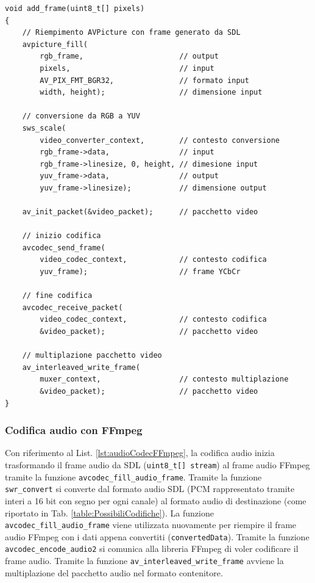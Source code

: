 \begin{lstlisting}[caption=Codice per la codifica video, label={lst:videoCodecFFmpeg}]
void add_frame(uint8_t[] pixels)
{
	// Riempimento AVPicture con frame generato da SDL
	avpicture_fill(
		rgb_frame, 						// output
		pixels, 						// input
		AV_PIX_FMT_BGR32,				// formato input
		width, height); 				// dimensione input

	// conversione da RGB a YUV
	sws_scale(
		video_converter_context,		// contesto conversione
		rgb_frame->data,				// input
		rgb_frame->linesize, 0, height,	// dimesione input
		yuv_frame->data, 				// output
		yuv_frame->linesize); 			// dimensione output
	
	av_init_packet(&video_packet);		// pacchetto video

	// inizio codifica
	avcodec_send_frame(
		video_codec_context,			// contesto codifica
		yuv_frame);						// frame YCbCr

	// fine codifica
	avcodec_receive_packet(
		video_codec_context,			// contesto codifica
		&video_packet);					// pacchetto video

	// multiplazione pacchetto video
	av_interleaved_write_frame(
		muxer_context,					// contesto multiplazione
		&video_packet);					// pacchetto video
}
\end{lstlisting}



\subsubsection{Codifica audio con FFmpeg}
Con riferimento al List. \ref{lst:audioCodecFFmpeg}, la codifica audio inizia trasformando il frame audio da SDL (\verb|uint8_t[] stream|) al frame audio FFmpeg tramite la funzione \verb|avcodec_fill_audio_frame|. Tramite la funzione \verb|swr_convert| si converte dal formato audio SDL (PCM rappresentato tramite interi a 16 bit con segno per ogni canale) al formato audio di destinazione (come riportato in Tab. \ref{table:PossibiliCodifiche}). La funzione \verb|avcodec_fill_audio_frame| viene utilizzata nuovamente per riempire il frame audio FFmpeg con i dati appena convertiti (\verb|convertedData|). Tramite la funzione \verb|avcodec_encode_audio2| si comunica alla libreria FFmpeg di voler codificare il frame audio. Tramite la funzione \verb|av_interleaved_write_frame| avviene la multiplazione del pacchetto audio nel formato contenitore.

